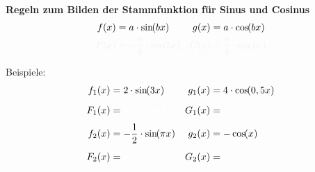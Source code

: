 \begin{tcolorbox}
	\textbf{Regeln zum Bilden der Stammfunktion für Sinus und Cosinus}
		\begin{align*}
			f(x)&=a\cdot\sinn{bx}&g(x)&=a\cdot\coss{bx}\\
			\textcolor{loestc}{F(x)}&\textcolor{loestc}{\;=-\frac{a}{b}\cdot\coss{bx}}&\textcolor{loestc}{G(x)}&\textcolor{loestc}{\;=\frac{a}{b}\cdot\sinn{bx}}
		\end{align*}

        \bigskip

\end{tcolorbox}
Beispiele:
\begin{align*}
	f_1(x)&=2\cdot\sinn{3x}&g_1(x)&=4\cdot\coss{0,5x}\\
	F_1(x)&=\textcolor{loes}{-\frac{2}{3}\cdot\coss{3x}}&G_1(x)&=\textcolor{loes}{8\cdot\sinn{0,5x}}\\
	f_2(x)&=-\frac{1}{2}\cdot\sinn{\pi x}&g_2(x)&=-\coss{x}\\
	F_2(x)&=\textcolor{loes}{\frac{1}{2\pi}\cdot\coss{\pi x}}&G_2(x)&=\textcolor{loes}{-\sinn{x}}
\end{align*}


